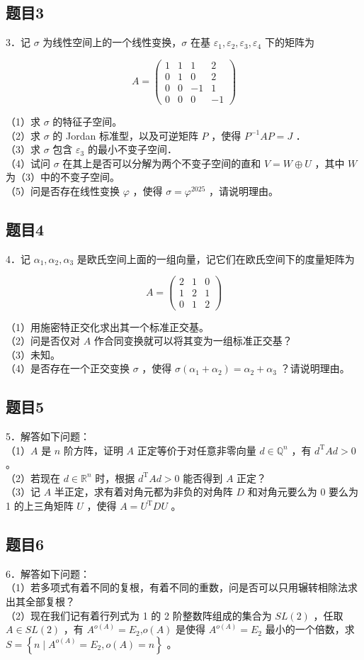 \documentclass{article}
\begin{document}
\subsection{题目3}
3．记 \(\sigma\) 为线性空间上的一个线性变换，\(\sigma\) 在基 \(\varepsilon_{1}, \varepsilon_{2}, \varepsilon_{3}, \varepsilon_{4}\) 下的矩阵为

\[
A=\left(\begin{array}{cccc}
1 & 1 & 1 & 2 \\
0 & 1 & 0 & 2 \\
0 & 0 & -1 & 1 \\
0 & 0 & 0 & -1
\end{array}\right)
\]

（1）求 \(\sigma\) 的特征子空间。\\
（2）求 \(\sigma\) 的 Jordan 标准型，以及可逆矩阵 \(P\) ，使得 \(P^{-1} A P=J\) ．\\
（3）求 \(\sigma\) 包含 \(\varepsilon_{3}\) 的最小不变子空间．\\
（4）试问 \(\sigma\) 在其上是否可以分解为两个不变子空间的直和 \(V=W \oplus U\) ，其中 \(W\) 为（3）中的不变子空间。\\
（5）问是否存在线性变换 \(\varphi\) ，使得 \(\sigma=\varphi^{2025}\) ，请说明理由。

\subsection{题目4}
4．记 \(\alpha_{1}, \alpha_{2}, \alpha_{3}\) 是欧氏空间上面的一组向量，记它们在欧氏空间下的度量矩阵为

\[
A=\left(\begin{array}{lll}
2 & 1 & 0 \\
1 & 2 & 1 \\
0 & 1 & 2
\end{array}\right)
\]

（1）用施密特正交化求出其一个标准正交基。\\
（2）问是否仅对 \(A\) 作合同变换就可以将其变为一组标准正交基？\\
（3）未知。\\
（4）是否存在一个正交变换 \(\sigma\) ，使得 \(\sigma\left(\alpha_{1}+\alpha_{2}\right)=\alpha_{2}+\alpha_{3}\) ？请说明理由。

\subsection{题目5}
5．解答如下问题：\\
（1）\(A\) 是 \(n\) 阶方阵，证明 \(A\) 正定等价于对任意非零向量 \(d \in \mathbb{Q}^{n}\) ，有 \(d^{\mathrm{T}} A d>0\) 。\\
（2）若现在 \(d \in \mathbb{R}^{n}\) 时，根据 \(d^{\mathrm{T}} A d>0\) 能否得到 \(A\) 正定？\\
（3）记 \(A\) 半正定，求有着对角元都为非负的对角阵 \(D\) 和对角元要么为 0 要么为 1 的上三角矩阵 \(U\) ，使得 \(A=U^{\mathrm{T}} D U\) 。

\subsection{题目6}
6．解答如下问题：\\
（1）若多项式有着不同的复根，有着不同的重数，问是否可以只用辗转相除法求出其全部复根？\\
（2）现在我们记有着行列式为 1 的 2 阶整数阵组成的集合为 \(S L(2)\) ，任取 \(A \in S L(2)\) ，有 \(A^{o(A)}=E_{2}\),\(o(A)\) 是使得 \(A^{o(A)}=E_{2}\) 最小的一个倍数，求 \(S=\left\{n \mid A^{o(A)}=E_{2}, o(A)=n\right\}\) 。
\end{document}
